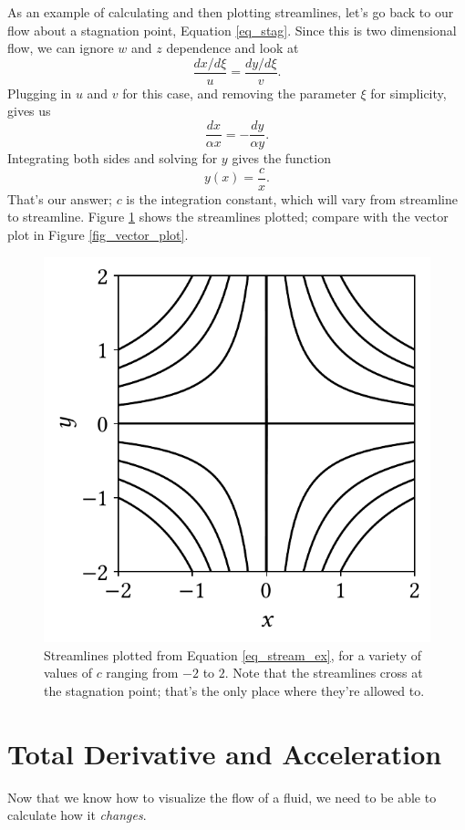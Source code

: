 \begin{example}
\label{ex_stag_stream}
As an example of calculating and then plotting streamlines, let's go back to our flow about a stagnation point, Equation \ref{eq_stag}.  Since this is two dimensional flow, we can ignore $w$ and $z$ dependence and look at 
\[
\frac{dx/d\xi}{u} = \frac{dy/d\xi}{v}.
\]
Plugging in \(u\) and \(v\) for this case, and removing the parameter $\xi$ for simplicity, gives us
\[
\frac{dx}{\alpha x} = -\frac{dy}{\alpha y}.
\] 
Integrating both sides and solving for \(y\) gives the function 
\begin{equation}
y(x) = \frac{c}{x}.
\label{eq_stream_ex}
\end{equation}
That's our answer; \(c\) is the integration constant, which will vary from streamline to streamline.  Figure \ref{fig_streamline_example} shows the streamlines plotted; compare with the vector plot in Figure \ref{fig_vector_plot}.
\end{example}

\begin{figure}[t]
\centering\includegraphics[width=0.5\linewidth]{Figures/Chapter1/fig_streamline_example}
\caption{Streamlines plotted from Equation \ref{eq_stream_ex}, for a variety of values of $c$ ranging from $-2$ to $2$.  Note that the streamlines cross at the stagnation point; that's the only place where they're allowed to.}
\label{fig_streamline_example}
\end{figure}

%
%
%

\section{Total Derivative and Acceleration}
\label{sec_tot_deriv}

Now that we know how to visualize the flow of a fluid, we need to be able to calculate how it \emph{changes}.  

